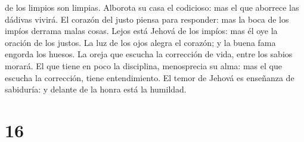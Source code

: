 de los limpios son limpias.  Alborota su casa el
codicioso: mas el que aborrece las dádivas vivirá.  El
corazón del justo piensa para responder: mas la boca de los impíos
derrama malas cosas.  Lejos está Jehová de los impíos:
mas él oye la oración de los justos.  La luz de los ojos
alegra el corazón; y la buena fama engorda los huesos. 
La oreja que escucha la corrección de vida, entre los sabios morará.
 El que tiene en poco la disciplina, menosprecia su alma:
mas el que escucha la corrección, tiene entendimiento. 
El temor de Jehová es enseñanza de sabiduría: y delante de la honra está
la humildad.

\hypertarget{section-20-16}{%
\section{16}\label{section-20-16}}

